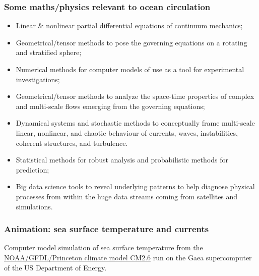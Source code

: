 \documentclass[10pt]{beamer}
\begin{document}
\begin{frame}
  \frametitle{Some maths/physics relevant to ocean circulation}


\vspace{-.5cm} 

\begin{exampleblock}{}
\begin{itemize}

\small 

\item Linear \& nonlinear partial differential equations of continuum
  mechanics;

\item Geometrical/tensor methods to pose the governing equations on a
  rotating and stratified sphere;

\item Numerical methods for computer models of use as a tool for
  experimental investigations;

\item Geometrical/tensor methods to analyze the space-time properties
  of complex and multi-scale flows emerging from the governing
  equations;

\item Dynamical systems and stochastic methods to conceptually frame
  multi-scale linear, nonlinear, and chaotic behaviour of currents,
  waves, instabilities, coherent structures, and turbulence.

\item Statistical methods for robust analysis and probabilistic
  methods for prediction;

\item Big data science tools to reveal underlying patterns to help
  diagnose physical processes from within the huge data streams coming
  from satellites and simulations.

\normalsize 

\end{itemize}

\end{exampleblock}{}

\end{frame}


\begin{frame}
  \frametitle{Animation: sea surface temperature and currents}

\begin{center}
\vspace{-.25cm}
\end{center}

\begin{center}
Computer model simulation of sea surface temperature from the
\href{https://vimeo.com/27076776}{NOAA/GFDL/Princeton climate model
  CM2.6} run on the Gaea supercomputer of the US Department of Energy. 
\end{center}

\end{frame}
\end{document}
